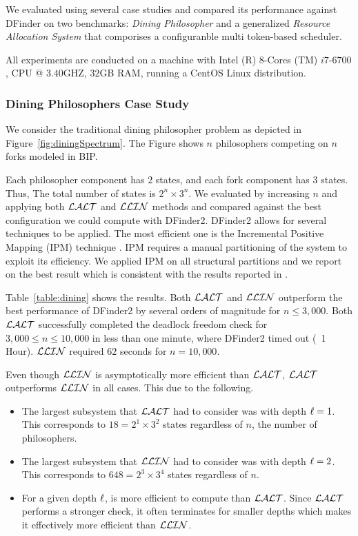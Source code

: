 We evaluated \deadlocktool{} using several case studies and compared its performance against DFinder on two benchmarks: 
{\em Dining Philosopher} and a generalized {\em Resource Allocation System} that comporises a configuranble multi 
token-based scheduler.

All experiments are conducted on a machine with Intel (R) $8$-Cores (TM) $i7$-$6700$, CPU @ $3.40$GHZ, $32$GB RAM, 
running a CentOS Linux distribution. 

\subsubsection{Dining Philosophers Case Study} 
We consider the traditional dining philosopher problem as depicted in 
Figure~\ref{fig:diningSpectrum}.
The Figure shows $n$ philosophers competing on $n$ forks modeled in BIP. 

Each philosopher component has $2$ states, and each fork component has $3$ states. 
Thus, The total number of states is $2^n \times 3^n$. 
We evaluated \deadlocktool{} by increasing $n$ and applying both $\mathcal{LALT}$ and $\mathcal{LLIN}$ methods and compared against the best configuration 
we could compute with DFinder2. 
DFinder2 allows for several techniques to be applied. The most efficient one is 
the Incremental Positive Mapping (IPM) technique \cite{DFINDER2-CAV}. 
IPM requires a manual partitioning of the system to exploit its efficiency. 
We applied IPM on all structural partitions and we report on the best result which is consistent 
with the results reported in \cite{DFINDER2-CAV}. 

Table~\ref{table:dining} shows the results. Both $\mathcal{LALT}$ and $\mathcal{LLIN}$ outperform the best performance of DFinder2 by several orders of magnitude 
for $n\leq 3,000$. Both $\mathcal{LALT}$ successfully completed the deadlock freedom check for $3,000 \leq n \leq 10,000$ 
in less than one minute, where DFinder2 timed out (~1 Hour). $\mathcal{LLIN}$ required $62$ seconds for $n=10,000$. 


Even though $\mathcal{LLIN}$ is asymptotically more efficient than $\mathcal{LALT}$,
$\mathcal{LALT}$ outperforms $\mathcal{LLIN}$ in all cases. This due to the following. 

\begin{itemize}
\item The largest subsystem that $\mathcal{LALT}$ had to consider was with depth $\ell=1$. This corresponds to $18 = 2^1\times 3^2$ states regardless of $n$, the number of philosophers. 
\item The largest subsystem that $\mathcal{LLIN}$ had to consider was with depth $\ell=2$. This corresponds to $648 = 2^3 \times 3^4$ states regardless of $n$. 
\item For a given depth $\ell$, \LLin is more efficient to compute than $\mathcal{LALT}$. 
 Since $\mathcal{LALT}$ performs a stronger check, it often terminates for smaller depths which makes it effectively more efficient than $\mathcal{LLIN}$. 
\end{itemize}


